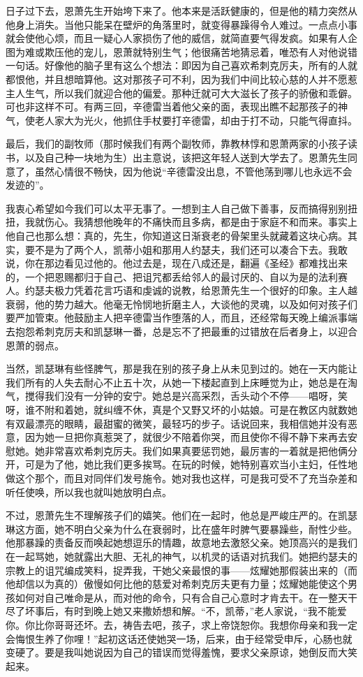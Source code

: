 \par 日子过下去，恩萧先生开始垮下来了。他本来是活跃健康的，但是他的精力突然从他身上消失。当他只能呆在壁炉的角落里时，就变得暴躁得令人难过。一点点小事就会使他心烦，而且一疑心人家损伤了他的威信，就简直要气得发疯。如果有人企图为难或欺压他的宠儿，恩萧就特别生气；他很痛苦地猜忌着，唯恐有人对他说错一句话。好像他的脑子里有这么个想法：即因为自己喜欢希刺克厉夫，所有的人就都恨他，并且想暗算他。这对那孩子可不利，因为我们中间比较心慈的人并不愿惹主人生气，所以我们就迎合他的偏爱。那种迁就可大大滋长了孩子的骄傲和乖僻。可也非这样不可。有两三回，辛德雷当着他父亲的面，表现出瞧不起那孩子的神气，使老人家大为光火，他抓住手杖要打辛德雷，却由于打不动，只能气得直抖。
\par 最后，我们的副牧师（那时候我们有两个副牧师，靠教林惇和恩萧两家的小孩子读书，以及自己种一块地为生）出主意说，该把这年轻人送到大学去了。恩萧先生同意了，虽然心情很不畅快，因为他说“辛德雷没出息，不管他荡到哪儿也永远不会发迹的”。
\par 我衷心希望如今我们可以太平无事了。一想到主人自己做下善事，反而搞得别别扭扭，我就伤心。我猜想他晚年的不痛快而且多病，都是由于家庭不和而来。事实上他自己也那么想：真的，先生，你知道这日渐衰老的骨架里头就藏着这块心病。其实，要不是为了两个人，凯蒂小姐和那用人约瑟夫，我们还可以凑合下去。我敢说，你在那边看见过他的。他过去是，现在八成还是，翻遍《圣经》都难找出来的，一个把恩赐都归于自己、把诅咒都丢给邻人的最讨厌的、自以为是的法利赛人。约瑟夫极力凭着花言巧语和虔诚的说教，给恩萧先生一个很好的印象。主人越衰弱，他的势力越大。他毫无怜悯地折磨主人，大谈他的灵魂，以及如何对孩子们要严加管束。他鼓励主人把辛德雷当作堕落的人，而且，还经常每天晚上编派事端去抱怨希刺克厉夫和凯瑟琳一番，总是忘不了把最重的过错放在后者身上，以迎合恩萧的弱点。
\par 当然，凯瑟琳有些怪脾气，那是我在别的孩子身上从未见到过的。她在一天内能让我们所有的人失去耐心不止五十次，从她一下楼起直到上床睡觉为止，她总是在淘气，搅得我们没有一分钟的安宁。她总是兴高采烈，舌头动个不停——唱呀，笑呀，谁不附和着她，就纠缠不休，真是个又野又坏的小姑娘。可是在教区内就数她有双最漂亮的眼睛，最甜蜜的微笑，最轻巧的步子。话说回来，我相信她并没有恶意，因为她一旦把你真惹哭了，就很少不陪着你哭，而且使你不得不静下来再去安慰她。她非常喜欢希刺克厉夫。我们如果真要惩罚她，最厉害的一着就是把他俩分开，可是为了他，她比我们更多挨骂。在玩的时候，她特别喜欢当小主妇，任性地做这个那个，而且对同伴们发号施令。她对我也这样，可是我可受不了充当杂差和听任使唤，所以我也就叫她放明白点。
\par 不过，恩萧先生不理解孩子们的嬉笑。他们在一起时，他总是严峻庄严的。在凯瑟琳这方面，她不明白父亲为什么在衰弱时，比在盛年时脾气要暴躁些，耐性少些。他那暴躁的责备反而唤起她想逗乐的情趣，故意地去激怒父亲。她顶高兴的是我们在一起骂她，她就露出大胆、无礼的神气，以机灵的话语对抗我们。她把约瑟夫的宗教上的诅咒编成笑料，捉弄我，干她父亲最恨的事——炫耀她那假装出来的（而他却信以为真的）傲慢如何比他的慈爱对希刺克厉夫更有力量；炫耀她能使这个男孩如何对自己唯命是从，而对他的命令，只有合自己心意时才肯去干。在一整天干尽了坏事后，有时到晚上她又来撒娇想和解。“不，凯蒂，”老人家说，“我不能爱你。你比你哥哥还坏。去，祷告去吧，孩子，求上帝饶恕你。我想你母亲和我一定会悔恨生养了你哩！”起初这话还使她哭一场，后来，由于经常受申斥，心肠也就变硬了。要是我叫她说因为自己的错误而觉得羞愧，要求父亲原谅，她倒反而大笑起来。
